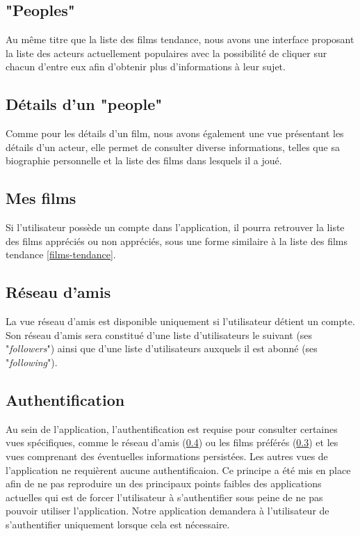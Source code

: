 \subsection{"Peoples"}
Au même titre que la liste des films tendance, nous avons une interface proposant la liste des acteurs actuellement populaires avec la possibilité de cliquer sur chacun d'entre eux afin d'obtenir plus d'informations à leur sujet.

\subsection{Détails d'un "people"}
Comme pour les détails d'un film, nous avons également une vue présentant les détails d'un acteur, elle permet de consulter diverse informations, telles que sa biographie personnelle et la liste des films dans lesquels il a joué.

\subsection{Mes films}\label{mes-films}
Si l'utilisateur possède un compte dans l'application, il pourra retrouver la liste des films appréciés ou non appréciés, sous une forme similaire à la liste des films tendance \ref{films-tendance}.

\subsection{Réseau d'amis}\label{reseau-amis}
La vue réseau d'amis est disponible uniquement si l'utilisateur détient un compte. Son réseau d'amis sera constitué d'une liste d'utilisateurs le suivant (ses "\textit{followers}") ainsi que d'une liste d'utilisateurs auxquels il est abonné (ses "\textit{following}").

\subsection{Authentification}
Au sein de l'application, l'authentification est requise pour consulter certaines vues spécifiques, comme le réseau d'amis (\ref{reseau-amis}) ou les films préférés (\ref{mes-films}) et les vues comprenant des éventuelles informations persistées.
Les autres vues de l'application ne requièrent aucune authentificaion. Ce principe a été mis en place afin de ne pas reproduire un des principaux points faibles des applications actuelles qui est de forcer l'utilisateur à s'authentifier sous peine de ne pas pouvoir utiliser l'application. Notre application demandera à l'utilisateur de s'authentifier uniquement lorsque cela est nécessaire.
 
